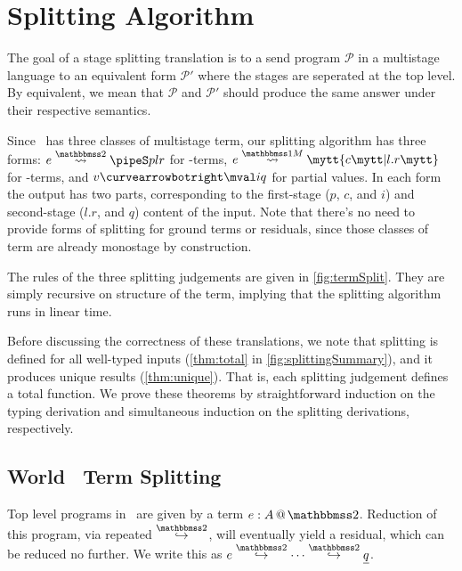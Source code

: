 
\section{Splitting Algorithm}
\label{sec:splitting}



\begin{abstrsyn}

The goal of a stage splitting translation 
is to a send program $\mathcal P$ in a multistage language
to an equivalent form $\mathcal P'$ where the stages are seperated at the top level.
By equivalent, we mean that $\mathcal P$ and $\mathcal P'$ should produce 
the same answer under their respective semantics.

Since \lang\ has three classes of multistage term, 
our splitting algorithm has three forms: 
$\splittwo e A p l r$ for \bbtwo-terms, 
$\splitone e A c {l.r}$ for \bbonem-terms, and 
$v \vsplito \mval i q$ for partial values.
In each form the output has two parts, corresponding to the
first-stage ($p$, $c$, and $i$) and second-stage ($l.r$, and $q$) content of the input.
Note that there's no need to provide forms of splitting for ground terms or residuals,
since those classes of term are already monostage by construction.

The rules of the three splitting judgements are given in \ref{fig:termSplit}.
They are simply recursive on structure of the term, 
implying that the splitting algorithm runs in linear time.

Before discussing the correctness of these translations, 
we note that splitting is defined for all well-typed inputs (\ref{thm:total} in \ref{fig:splittingSummary}), and it produces unique results (\ref{thm:unique}).
That is, each splitting judgement defines a total function.
We prove these theorems by straightforward induction on the typing derivation
and simultaneous induction on the splitting derivations, respectively.

\subsection{World \bbtwo\ Term Splitting}

Top level programs in \lang\ are given by a term $\coltwo e A$.
Reduction of this program, via repeated $\stepsym \bbtwo$, will eventually yield a residual, which can be reduced no further.
We write this as $e \stepsym \bbtwo \cdots \stepsym \bbtwo \exv q$.


\end{abstrsyn}
